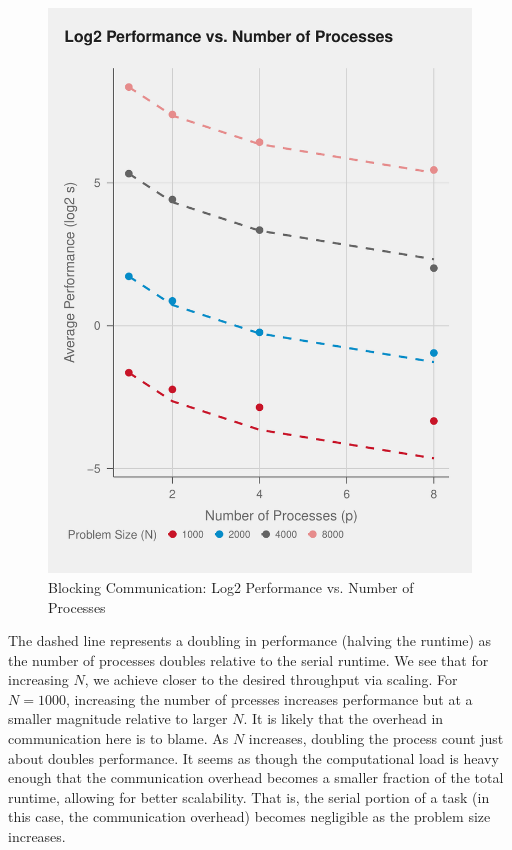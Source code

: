 \documentclass{article}
\begin{document}
\begin{figure}[H]
   \centering
   \includegraphics[scale=0.4]{../part2/out/np.pdf} 
   \caption{Blocking Communication: Log2 Performance vs. Number of Processes}
\end{figure}
\noindent The dashed line represents a doubling in performance (halving the runtime) 
as the number of processes doubles relative to the serial runtime. We see that 
for increasing $N$, we achieve closer to the desired throughput via scaling. 
For $N = 1000$, increasing the number of prcesses increases performance but at a 
smaller magnitude relative to larger $N$. It is likely that the overhead in 
communication here is to blame. As $N$ increases, doubling the process count 
just about doubles performance. It seems as though the computational load is 
heavy enough that the communication overhead becomes a smaller fraction of 
the total runtime, allowing for better scalability. That is, the serial portion of a task 
(in this case, the communication overhead) becomes negligible as the problem size increases.
\end{document}
